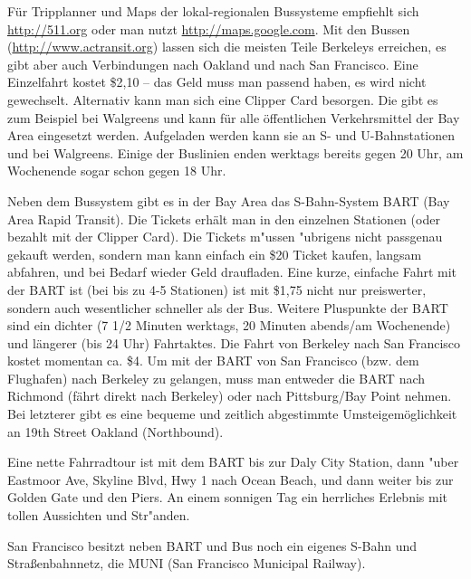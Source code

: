 \documentclass[a4paper]{scrreprt}
\begin{document}
Für Tripplanner und Maps der lokal-regionalen Bussysteme empfiehlt sich \url{http://511.org} oder man nutzt \url{http://maps.google.com}. 
Mit den Bussen (\url{http://www.actransit.org}) lassen sich die meisten Teile Berkeleys erreichen, es gibt aber auch Verbindungen nach Oakland und nach San Francisco. 
Eine Einzelfahrt kostet \$2,10 -- das Geld muss man passend haben, es wird nicht gewechselt. 
%
%
Alternativ kann man sich eine Clipper Card besorgen. Die gibt es zum
Beispiel bei Walgreens und kann für alle öffentlichen Verkehrsmittel
der Bay Area eingesetzt werden.  Aufgeladen werden kann sie an S- und
U-Bahnstationen und bei Walgreens.  Einige der Buslinien enden
werktags bereits gegen 20 Uhr, am Wochenende sogar schon gegen 18 Uhr.

Neben dem Bussystem gibt es in der Bay Area das S-Bahn-System BART (Bay Area Rapid Transit).
Die Tickets erhält man in den einzelnen Stationen (oder bezahlt mit der Clipper Card).
Die Tickets m"ussen "ubrigens nicht passgenau gekauft werden, sondern man kann einfach ein \$20 Ticket kaufen, langsam abfahren, und bei Bedarf wieder Geld draufladen.
Eine kurze, einfache Fahrt mit der BART ist (bei bis zu 4-5 Stationen) ist mit \$1,75 nicht nur preiswerter, sondern auch wesentlicher schneller als der Bus. Weitere Pluspunkte der BART sind ein dichter (7 1/2 Minuten werktags, 20 Minuten abends/am Wochenende) und längerer (bis 24 Uhr) Fahrtaktes.
Die Fahrt von Berkeley nach San Francisco kostet momentan ca. \$4. 
Um mit der BART von San Francisco (bzw. dem Flughafen) nach Berkeley zu gelangen, muss man entweder die BART nach Richmond (fährt direkt nach Berkeley) oder nach Pittsburg/Bay Point nehmen. 
Bei letzterer gibt es eine bequeme und zeitlich abgestimmte Umsteigemöglichkeit an 19th Street Oakland (Northbound).


Eine nette Fahrradtour ist mit dem BART bis zur Daly City Station, 
%
\marginpar{\raggedright\footnotesize\textcolor{red}{Gehört das hier hin? Oder eher weiter nach hinten?}}
%
dann "uber Eastmoor Ave, Skyline Blvd, Hwy 1 nach Ocean Beach, und dann weiter bis zur Golden Gate und den Piers. 
An einem sonnigen Tag ein herrliches Erlebnis mit tollen Aussichten und Str"anden.


San Francisco besitzt neben BART und Bus noch ein eigenes S-Bahn und Straßenbahnnetz, die MUNI (San Francisco Municipal Railway). 
\end{document}
